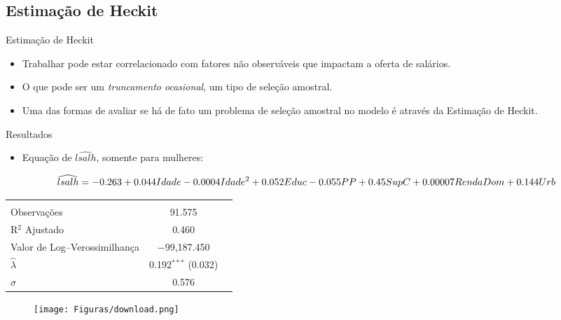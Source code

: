 \documentclass[xcolor={dvipsnames}]{beamer}
\begin{document}
\subsection{Estimação de Heckit}
\begin{frame}{Estimação de Heckit}
    \begin{itemize}
        \item  Trabalhar pode estar correlacionado com fatores não observáveis que impactam a oferta de salários.
        \item O que pode ser um \textit{truncamento ocasional}, um tipo de seleção amostral.
        \item Uma das formas de avaliar se há de fato um problema de seleção amostral no modelo é através da Estimação de Heckit.
    \end{itemize}
\end{frame}

\begin{frame}{Resultados}
    \begin{itemize}
        \item Equação de $\widehat{lsalh}$, somente para mulheres:
    \end{itemize}
\[\widehat{lsalh} = -0.263 + 0.044Idade - 0.0004Idade^2 + 0.052Educ \\ 
    - 0.055PP + 0.45SupC + 0.00007RendaDom + 0.144Urb\]
\begin{table}[H]
\centering 
\begin{adjustbox}{width=0.6\columnwidth,center}
\begin{tabular}{lc} \hline \\[-1.8ex] 
Observações & 91.575 \\ 
R$^2$ Ajustado & 0.460 \\
Valor de Log{--}Verossimilhança & $-$99,187.450 \\ 
$\hat{\lambda}$ & 0.192$^{***}$  (0.032) \\ 
$\sigma$ & 0.576 & 
\hline 
\end{tabular} 
\end{adjustbox}
\end{table}
\end{frame}

\begin{frame}
    \titlepage
    \begin{figure}[htpb]
        \texttt{[image: Figuras/download.png]}
    \end{figure}
\end{frame}
\end{document}
